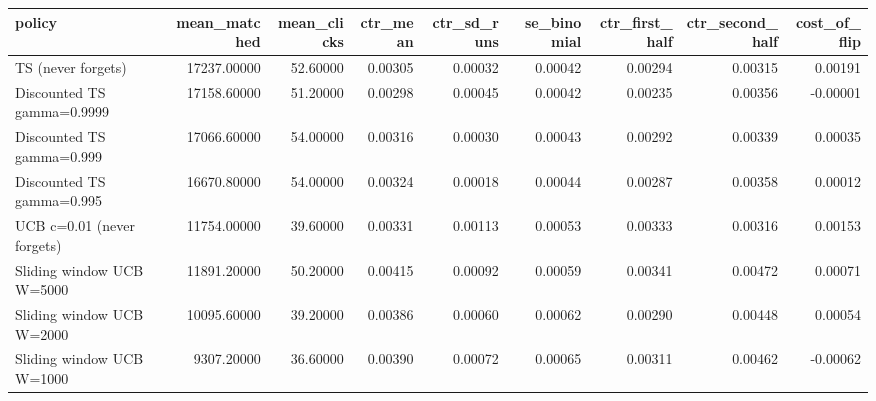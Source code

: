 \begin{tabular}{lrrrrrrrr}
\toprule
policy & mean\_matched & mean\_clicks & ctr\_mean & ctr\_sd\_runs & se\_binomial & ctr\_first\_half & ctr\_second\_half & cost\_of\_flip \\
\midrule
TS (never forgets) & 17237.00000 & 52.60000 & 0.00305 & 0.00032 & 0.00042 & 0.00294 & 0.00315 & 0.00191 \\
Discounted TS gamma=0.9999 & 17158.60000 & 51.20000 & 0.00298 & 0.00045 & 0.00042 & 0.00235 & 0.00356 & -0.00001 \\
Discounted TS gamma=0.999 & 17066.60000 & 54.00000 & 0.00316 & 0.00030 & 0.00043 & 0.00292 & 0.00339 & 0.00035 \\
Discounted TS gamma=0.995 & 16670.80000 & 54.00000 & 0.00324 & 0.00018 & 0.00044 & 0.00287 & 0.00358 & 0.00012 \\
UCB c=0.01 (never forgets) & 11754.00000 & 39.60000 & 0.00331 & 0.00113 & 0.00053 & 0.00333 & 0.00316 & 0.00153 \\
Sliding window UCB W=5000 & 11891.20000 & 50.20000 & 0.00415 & 0.00092 & 0.00059 & 0.00341 & 0.00472 & 0.00071 \\
Sliding window UCB W=2000 & 10095.60000 & 39.20000 & 0.00386 & 0.00060 & 0.00062 & 0.00290 & 0.00448 & 0.00054 \\
Sliding window UCB W=1000 & 9307.20000 & 36.60000 & 0.00390 & 0.00072 & 0.00065 & 0.00311 & 0.00462 & -0.00062 \\
\bottomrule
\end{tabular}
